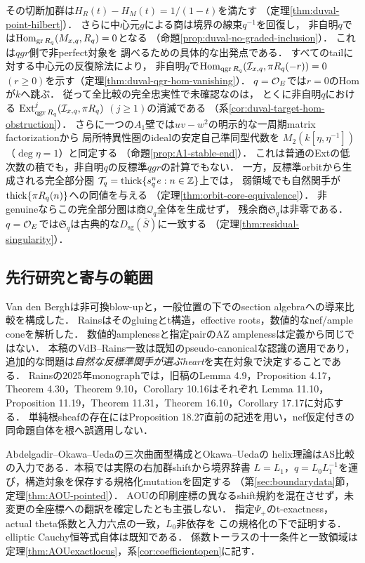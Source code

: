 その切断加群は$H_R(t)-H_M(t)=1/(1-t)$を満たす
（定理\ref{thm:duval-point-hilbert}）．
さらに中心元$g$による商は境界の線束$q^{-1}$を回復し，
非自明$q$では$\operatorname{Hom}_{\operatorname{gr} R_q}(M_{x,q},R_q)=0$となる
（命題\ref{prop:duval-no-graded-inclusion}）．
これは$qgr$側で非perfect対象を
調べるための具体的な出発点である．
すべてのtailに対する中心元の反復除法により，
非自明$q$で$\operatorname{Hom}_{\operatorname{qgr} R_q}(\mathcal I_{x,q},\pi R_q(-r))=0$
$(r\ge0)$を示す（定理\ref{thm:duval-qgr-hom-vanishing}）．
$q=\mathcal O_E$では$r=0$のHomが$k$へ跳ぶ．
従って全比較の完全忠実性で未確認なのは，
とくに非自明$q$における
$\operatorname{Ext}^j_{\operatorname{qgr} R_q}(\mathcal I_{x,q},\pi R_q)$
$(j\ge1)$の消滅である
（系\ref{cor:duval-target-hom-obstruction}）．
さらに一つの$A_1$壁では$uv-w^2$の明示的な一周期matrix factorizationから
局所特異性圏のidealの安定自己準同型代数を
$M_2(k[\eta,\eta^{-1}])$（$\deg\eta=1$）と同定する
（命題\ref{prop:A1-stable-end}）．
これは普通のExtの低次数の積でも，非自明$q$の反標準$qgr$の計算でもない．
一方，反標準orbitから生成される完全部分圏
$\mathcal T_q=\operatorname{thick}\{s_q^ne:n\in\mathbb Z\}$上では，
弱領域でも自然関手が$\operatorname{thick}\{\pi R_q(n)\}$への同値を与える
（定理\ref{thm:orbit-core-equivalence}）．
非genuineならこの完全部分圏は商$\mathcal Q_q$全体を生成せず，
残余商$\mathfrak S_q$は非零である．
$q=\mathcal O_E$では$\mathfrak S_q$は古典的な$D_{\mathrm{sg}}(\overline S)$に一致する
（定理\ref{thm:residual-singularity}）．

\subsection{先行研究と寄与の範囲}
Van den Bergh\cite{VdB}は非可換blow-upと，一般位置の下でのsection algebraへの導来比較を構成した．
Rains\cite{Rains,Filtered}はそのgluingとt構造，effective roots，数値的なnef/ample coneを解析した．
数値的amplenessと指定pairのAZ amplenessは定義から同じではない．
本稿のVdB--Rains一致は既知のpseudo-canonicalな認識の適用であり，
追加的な問題は\emph{自然な反標準関手が選ぶheart}を実在対象で決定することである．
Rainsの2025年monograph\cite{RainsBook}では，旧稿のLemma 4.9，Proposition 4.17，
Theorem 4.30，Theorem 9.10，Corollary 10.16はそれぞれ
Lemma 11.10，Proposition 11.19，Theorem 11.31，Theorem 16.10，Corollary 17.17に対応する．
単純根sheafの存在にはProposition 18.27直前の記述を用い，nef仮定付きの同命題自体を根へ誤適用しない．

Abdelgadir--Okawa--Ueda\cite{AOU}の三次曲面型構成とOkawa--Ueda\cite{OU,OUHelices}の
helix理論はAS比較の入力である．本稿では実際の右加群shiftから境界辞書
$L=L_1$，$q=L_0L_1^{-1}$を運び，構造対象を保存する規格化mutationを固定する
（第\ref{sec:boundarydata}節，定理\ref{thm:AOU-pointed}）．
AOUの印刷座標の異なるshift規約を混在させず，未変更の全座標への翻訳を確定したとも主張しない．
指定$\Psi_+$のt-exactness，actual theta係数と入力六点の一致，$L_0$非依存を
この規格化の下で証明する．elliptic Cauchy恒等式自体は既知\cite{EllipticCauchy}である．
係数トーラスの十一条件と一致領域は定理\ref{thm:AOUexactlocus}，系\ref{cor:coefficientopen}に記す．

